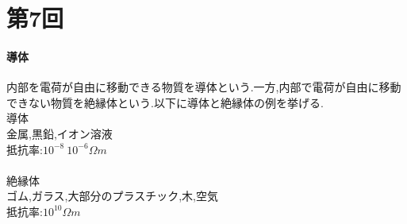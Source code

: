 \documentclass[../main]{subfiles}
\begin{document}
\clearpage

\setcounter{eqnarray}{0}
\setcounter{equation}{0}
\setcounter{figure}{0}

\part*{第7回}

\subsection{導体}
内部を電荷が自由に移動できる物質を導体という.一方,内部で電荷が自由に移動できない物質を絶縁体という.以下に導体と絶縁体の例を挙げる. \\
導体 \\
金属,黒鉛,イオン溶液 \\
抵抗率:$10^{-8}~10^{-6} \Omega m$ \\
\\
絶縁体 \\
ゴム,ガラス,大部分のプラスチック,木,空気 \\
抵抗率:$10^{10} \Omega m$ \\
\end{document}
